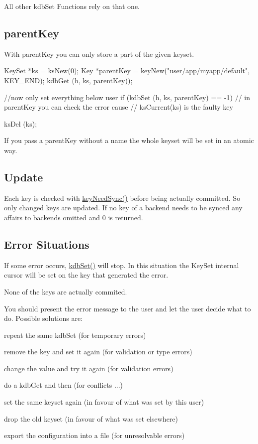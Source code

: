 All other kdbSet Functions rely on that one.\hypertarget{group__kdb_kdbsetparent}{}\subsection{parentKey}\label{group__kdb_kdbsetparent}
With parentKey you can only store a part of the given keyset.


\begin{DoxyCode}
KeySet *ks = ksNew(0);
Key *parentKey = keyNew("user/app/myapp/default", KEY_END);
kdbGet (h, ks, parentKey));

//now only set everything below user
if (kdbSet (h, ks, parentKey) == -1)
{
        // in parentKey you can check the error cause
        // ksCurrent(ks) is the faulty key
}

ksDel (ks);
\end{DoxyCode}


If you pass a parentKey without a name the whole keyset will be set in an atomic way.\hypertarget{group__kdb_kdbsetupdate}{}\subsection{Update}\label{group__kdb_kdbsetupdate}
Each key is checked with \hyperlink{group__keytest_gaf247df0de7aca04b32ef80e39ef12950}{keyNeedSync()} before being actually committed. So only changed keys are updated. If no key of a backend needs to be synced any affairs to backends omitted and 0 is returned.\hypertarget{group__kdb_kdbseterror}{}\subsection{Error Situations}\label{group__kdb_kdbseterror}
If some error occurs, \hyperlink{group__kdb_ga11436b058408f83d303ca5e996832bcf}{kdbSet()} will stop. In this situation the KeySet internal cursor will be set on the key that generated the error.

None of the keys are actually commited.

You should present the error message to the user and let the user decide what to do. Possible solutions are:
\begin{DoxyItemize}
\item repeat the same kdbSet (for temporary errors)
\item remove the key and set it again (for validation or type errors)
\item change the value and try it again (for validation errors)
\item do a kdbGet and then (for conflicts ...)
\begin{DoxyItemize}
\item set the same keyset again (in favour of what was set by this user)
\item drop the old keyset (in favour of what was set elsewhere)
\end{DoxyItemize}
\item export the configuration into a file (for unresolvable errors)
\end{DoxyItemize}

